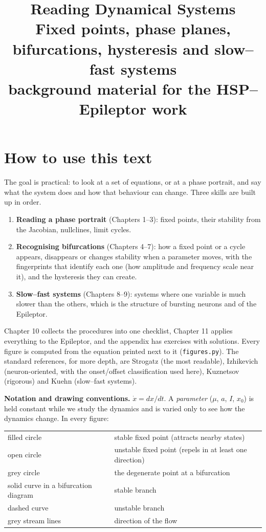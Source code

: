 \documentclass[11pt,openany]{report}
\title{\textbf{Reading Dynamical Systems}\\[0.4em]
\large Fixed points, phase planes, bifurcations, hysteresis and slow--fast systems\\[0.2em]
\normalsize background material for the HSP--Epileptor work}
\author{}
\date{}
\begin{document}
\maketitle
\tableofcontents

\chapter*{How to use this text}
The goal is practical: to look at a set of equations, or at a phase portrait, and say what the system does and how
that behaviour can change. Three skills are built up in order.
\begin{enumerate}
\item \textbf{Reading a phase portrait} (Chapters 1--3): fixed points, their stability from the Jacobian, nullclines,
limit cycles.
\item \textbf{Recognising bifurcations} (Chapters 4--7): how a fixed point or a cycle appears, disappears or changes
stability when a parameter moves, with the fingerprints that identify each one (how amplitude and frequency scale near
it), and the hysteresis they can create.
\item \textbf{Slow--fast systems} (Chapters 8--9): systems where one variable is much slower than the others, which is
the structure of bursting neurons and of the Epileptor.
\end{enumerate}
Chapter 10 collects the procedures into one checklist, Chapter 11 applies everything to the Epileptor, and the
appendix has exercises with solutions. Every figure is computed from the equation printed next to it
(\texttt{figures.py}). The standard references, for more depth, are Strogatz \cite{strogatz} (the most readable),
Izhikevich \cite{izhikevich} (neuron-oriented, with the onset/offset classification used here), Kuznetsov \cite{kuznetsov}
(rigorous) and Kuehn \cite{kuehn} (slow--fast systems).

\textbf{Notation and drawing conventions.} $\dot x = dx/dt$. A \emph{parameter} ($\mu$, $a$, $I$, $x_0$) is held constant
while we study the dynamics and is varied only to see how the dynamics change. In every figure:
\begin{center}\small
\begin{tabular}{ll}
\toprule
filled circle & stable fixed point (attracts nearby states) \\
open circle & unstable fixed point (repels in at least one direction) \\
grey circle & the degenerate point at a bifurcation \\
solid curve in a bifurcation diagram & stable branch \\
dashed curve & unstable branch \\
grey stream lines & direction of the flow \\
\bottomrule
\end{tabular}
\end{center}
\end{document}
